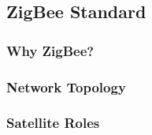
\subsection{ZigBee Standard}


\subsubsection{Why ZigBee?}


\subsubsection{Network Topology}


\subsubsection{Satellite Roles}

